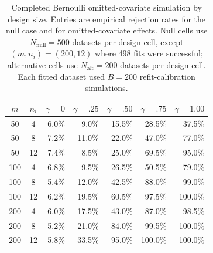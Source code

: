 \begin{table}[htbp]
\small
\setlength{\tabcolsep}{4pt}
\caption{Completed Bernoulli omitted-covariate simulation by design size. Entries are empirical rejection rates for the null case and for omitted-covariate effects. Null cells use $N_{\mathrm{null}}=500$ datasets per design cell, except $(m,n_i)=(200,12)$ where 498 fits were successful; alternative cells use $N_{\mathrm{alt}}=200$ datasets per design cell. Each fitted dataset used $B=200$ refit-calibration simulations.}
\label{tab:bernoulli-power-full-design}
\begin{tabular*}{\textwidth}{@{}c@{\extracolsep{\fill}}crrrrr@{}}
\toprule
$m$ & $n_i$ & $\gamma=0$ & $\gamma=.25$ & $\gamma=.50$ & $\gamma=.75$ & $\gamma=1.00$ \\
\midrule
50 & 4 & 6.0\% & 9.0\% & 15.5\% & 28.5\% & 37.5\% \\
50 & 8 & 7.2\% & 11.0\% & 22.0\% & 47.0\% & 77.0\% \\
50 & 12 & 7.4\% & 8.5\% & 25.0\% & 69.5\% & 95.0\% \\
100 & 4 & 6.8\% & 9.5\% & 26.5\% & 50.5\% & 79.0\% \\
100 & 8 & 5.4\% & 12.0\% & 42.5\% & 88.0\% & 99.0\% \\
100 & 12 & 6.2\% & 19.5\% & 60.5\% & 97.5\% & 100.0\% \\
200 & 4 & 6.0\% & 17.5\% & 43.0\% & 87.0\% & 98.5\% \\
200 & 8 & 5.2\% & 21.0\% & 84.0\% & 99.5\% & 100.0\% \\
200 & 12 & 5.8\% & 33.5\% & 95.0\% & 100.0\% & 100.0\% \\
\bottomrule
\end{tabular*}
\end{table}
